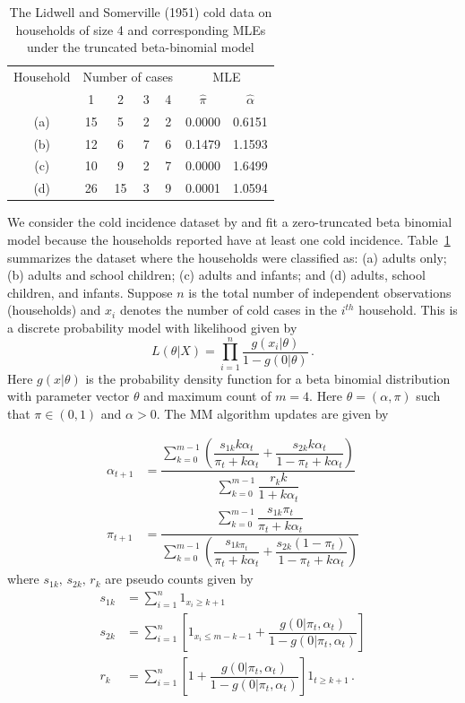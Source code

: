 \documentclass[12pt]{article}
\begin{document}
\begin{table}[h]
\centering
\begin{tabular}{c c c c c c c} 
 \hline
 Household & \multicolumn{4}{c}{Number of cases} & \multicolumn{2}{c}{MLE} \\ [0.5ex] 
     & 1 & 2 & 3 & 4 & $\hat{\pi}$ & $\hat{\alpha}$ \\ [0.5ex]
 \hline
 (a) & 15 & 5 & 2 & 2 &  0.0000 & 0.6151 \\ 
 (b) & 12 & 6 & 7 & 6 & 0.1479 & 1.1593 \\
 (c) & 10 & 9 & 2 & 7 & 0.0000 & 1.6499 \\
 (d) & 26 & 15 & 3 & 9& 0.0001 & 1.0594 \\[1ex] 
 \hline
\end{tabular}
\caption{The Lidwell and Somerville (1951) cold data on households
of size 4 and corresponding MLEs under the truncated beta-binomial
model}
\label{tab:bet_binom_data}
\end{table}
We consider the cold incidence dataset by \cite{lidwell1951observations} and fit a zero-truncated beta binomial model because the households reported have at least one cold incidence. Table~\ref{tab:bet_binom_data} summarizes the dataset where the households were classified as: (a) adults only; (b) adults and school children; (c) adults and infants; and (d) adults,
school children, and infants. Suppose $n$ is the total number of independent observations (households) and $x_i$ denotes the number of cold cases in the $i^{th}$ household. This is a discrete probability model with likelihood given by
\[
L(\theta | X) = \prod_{i=1}^{n}\dfrac{g(x_i| \theta)}{1-g(0|\theta)}\,.
\]
Here $g(x|\theta)$ is the probability density function for a beta binomial distribution with parameter vector $\theta$ and maximum count of $m=4$. Here $\theta = (\alpha, \pi)$ such that $\pi \in (0,1)$ and $\alpha >0$. The MM algorithm updates are given by 

\begin{align*}
    \alpha_{t+1} &= \dfrac{\sum_{k=0}^{m-1} (\dfrac{s_{1k}k \alpha_t}{\pi_t + k\alpha_t} + \dfrac{s_{2k}k \alpha_t}{1 - \pi_t + k\alpha_t})}{\sum_{k=0}^{m-1}\dfrac{r_k k }{1 + k \alpha_t}}\\
    \pi_{t+1} &= \dfrac{\sum_{k=0}^{m-1}\dfrac{s_{1k}\pi_t}{\pi_t + k\alpha_t}}{\sum_{k=0}^{m-1}(\dfrac{s_{1k \pi_t}}{\pi_t + k \alpha_t} + \dfrac{s_{2k}(1-\pi_t)}{1- \pi_t + k \alpha_t})}
\end{align*}
where $s_{1k}, \, s_{2k},\, r_k$ are pseudo counts given by
\begin{align*}
    s_{1k} &= \sum_{i=1}^{n}1_{x_i \geq k+1}\\
    s_{2k} &= \sum_{i=1}^{n} \left[ 1_{x_i \leq m-k-1} + \dfrac{g(0|\pi_t, \alpha_t)}{1 - g(0 | \pi_t, \alpha_t)} \right]\\
    r_k &= \sum_{i=1}^{n}\left[ 1 +  \dfrac{g(0|\pi_t, \alpha_t)}{1 - g(0 | \pi_t, \alpha_t)} \right] 1_{t \geq k+1}\,.
\end{align*}
\end{document}
